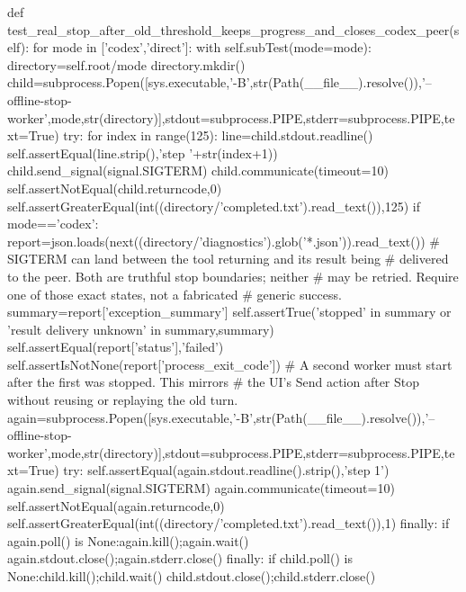     def test_real_stop_after_old_threshold_keeps_progress_and_closes_codex_peer(self):
        for mode in ['codex','direct']:
            with self.subTest(mode=mode):
                directory=self.root/mode
                directory.mkdir()
                child=subprocess.Popen([sys.executable,'-B',str(Path(__file__).resolve()),'--offline-stop-worker',mode,str(directory)],stdout=subprocess.PIPE,stderr=subprocess.PIPE,text=True)
                try:
                    for index in range(125):
                        line=child.stdout.readline()
                        self.assertEqual(line.strip(),'step '+str(index+1))
                    child.send_signal(signal.SIGTERM)
                    child.communicate(timeout=10)
                    self.assertNotEqual(child.returncode,0)
                    self.assertGreaterEqual(int((directory/'completed.txt').read_text()),125)
                    if mode=='codex':
                        report=json.loads(next((directory/'diagnostics').glob('*.json')).read_text())
                        # SIGTERM can land between the tool returning and its result being
                        # delivered to the peer. Both are truthful stop boundaries; neither
                        # may be retried. Require one of those exact states, not a fabricated
                        # generic success.
                        summary=report['exception_summary']
                        self.assertTrue('stopped' in summary or 'result delivery unknown' in summary,summary)
                        self.assertEqual(report['status'],'failed')
                        self.assertIsNotNone(report['process_exit_code'])
                    # A second worker must start after the first was stopped. This mirrors
                    # the UI's Send action after Stop without reusing or replaying the old turn.
                    again=subprocess.Popen([sys.executable,'-B',str(Path(__file__).resolve()),'--offline-stop-worker',mode,str(directory)],stdout=subprocess.PIPE,stderr=subprocess.PIPE,text=True)
                    try:
                        self.assertEqual(again.stdout.readline().strip(),'step 1')
                        again.send_signal(signal.SIGTERM)
                        again.communicate(timeout=10)
                        self.assertNotEqual(again.returncode,0)
                        self.assertGreaterEqual(int((directory/'completed.txt').read_text()),1)
                    finally:
                        if again.poll() is None:again.kill();again.wait()
                        again.stdout.close();again.stderr.close()
                finally:
                    if child.poll() is None:child.kill();child.wait()
                    child.stdout.close();child.stderr.close()


